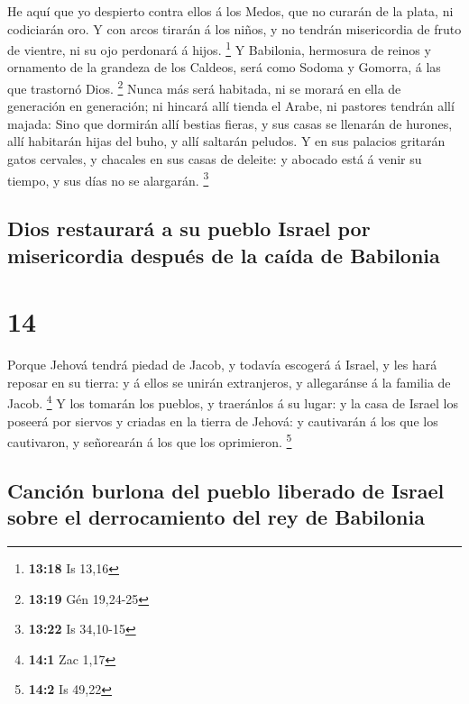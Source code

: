  He aquí que yo despierto contra ellos á los Medos, que no
curarán de la plata, ni codiciarán oro.  Y con arcos
tirarán á los niños, y no tendrán misericordia de fruto de vientre, ni
su ojo perdonará á hijos. \footnote{\textbf{13:18} Is 13,16}
 Y Babilonia, hermosura de reinos y ornamento de la
grandeza de los Caldeos, será como Sodoma y Gomorra, á las que trastornó
Dios. \footnote{\textbf{13:19} Gén 19,24-25}  Nunca más
será habitada, ni se morará en ella de generación en generación; ni
hincará allí tienda el Arabe, ni pastores tendrán allí majada:
 Sino que dormirán allí bestias fieras, y sus casas se
llenarán de hurones, allí habitarán hijas del buho, y allí saltarán
peludos.  Y en sus palacios gritarán gatos cervales, y
chacales en sus casas de deleite: y abocado está á venir su tiempo, y
sus días no se alargarán. \footnote{\textbf{13:22} Is 34,10-15}

\hypertarget{dios-restauraruxe1-a-su-pueblo-israel-por-misericordia-despuuxe9s-de-la-cauxedda-de-babilonia}{%
\subsection{Dios restaurará a su pueblo Israel por misericordia después
de la caída de
Babilonia}\label{dios-restauraruxe1-a-su-pueblo-israel-por-misericordia-despuuxe9s-de-la-cauxedda-de-babilonia}}

\hypertarget{section-13}{%
\section{14}\label{section-13}}

 Porque Jehová tendrá piedad de Jacob, y todavía escogerá á
Israel, y les hará reposar en su tierra: y á ellos se unirán
extranjeros, y allegaránse á la familia de Jacob. \footnote{\textbf{14:1}
  Zac 1,17}  Y los tomarán los pueblos, y traeránlos á su
lugar: y la casa de Israel los poseerá por siervos y criadas en la
tierra de Jehová: y cautivarán á los que los cautivaron, y señorearán á
los que los oprimieron. \footnote{\textbf{14:2} Is 49,22}

\hypertarget{canciuxf3n-burlona-del-pueblo-liberado-de-israel-sobre-el-derrocamiento-del-rey-de-babilonia}{%
\subsection{Canción burlona del pueblo liberado de Israel sobre el
derrocamiento del rey de
Babilonia}\label{canciuxf3n-burlona-del-pueblo-liberado-de-israel-sobre-el-derrocamiento-del-rey-de-babilonia}}


